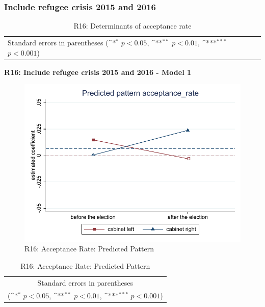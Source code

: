 \documentclass[10pt,a4paper]{scrartcl}
\begin{document}


\clearpage
\FloatBarrier
\subsubsection{Include refugee crisis 2015 and 2016}
\begin{table}[!ht]\centering
	\renewcommand{\arraystretch}{1.25}
	\small
	\def\sym#1{\ifmmode^{#1}\else\(^{#1}\)\fi}
	\caption{R16: Determinants of acceptance rate}
	\begin{tabular}{l*{3}{c}}
		\hline\hline
		
		\hline\hline
		\multicolumn{4}{l}{\footnotesize Standard errors in parentheses (\sym{*} \(p<0.05\), \sym{**} \(p<0.01\), \sym{***} \(p<0.001\))}\\
	\end{tabular}
\end{table}

\clearpage
\textbf{R16: Include refugee crisis 2015 and 2016 - Model 1}
\begin{figure}[!ht]
	\centering
	\includegraphics[width=1\textwidth]{figures_edited/acceptance_rate_graph1_R16.pdf}
	\caption{R16: Acceptance Rate: Predicted Pattern}
\end{figure}

\begin{table}[!ht]\centering
	\renewcommand{\arraystretch}{1.25}
	\def\sym#1{\ifmmode^{#1}\else\(^{#1}\)\fi}
	\caption{R16: Acceptance Rate: Predicted Pattern}
	\begin{tabular}{l*{2}{c}}
		\hline\hline
		
		\hline\hline
		\multicolumn{3}{c}{\footnotesize Standard errors in parentheses} \\
		\multicolumn{3}{c}{\footnotesize (\sym{*} \(p<0.05\), \sym{**} \(p<0.01\), \sym{***} \(p<0.001\))}\\
	\end{tabular}
\end{table}
\end{document}
